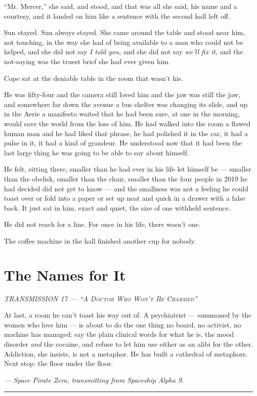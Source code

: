 \documentclass[11pt,openany]{book}
\newcommand{\transheader}{\normalfont\footnotesize\scshape\letterspace}
\newcommand{\letterspace}{}
\newenvironment{transmission}{%
  \par\vspace{0.3\baselineskip}\begin{center}\begin{minipage}{0.88\textwidth}%
  \itshape\small\setlength{\parindent}{0pt}\setstretch{1.06}}%
  {\end{minipage}\end{center}\vspace{0.4\baselineskip}%
  \noindent\hfil\rule{0.35\textwidth}{0.3pt}\hfil\par\vspace{1.0\baselineskip}}
\begin{document}
``Mr. Mercer,'' she said, and stood, and that was all she said, his name and a courtesy, and it landed on him like a sentence with the second half left off.

Sun stayed. Sun always stayed. She came around the table and stood near him, not touching, in the way she had of being available to a man who could not be helped, and she did not say \textit{I told you,} and she did not say \textit{we'll fix it,} and the not-saying was the truest brief she had ever given him.

Cope sat at the deniable table in the room that wasn't his.

He was fifty-four and the camera still loved him and the jaw was still the jaw, and somewhere far down the avenue a bus shelter was changing its slide, and up in the Aerie a manifesto waited that he had been sure, at one in the morning, would save the world from the loss of him. He had walked into the room a flawed human man and he had liked that phrase, he had polished it in the car, it had a pulse in it, it had a kind of grandeur. He understood now that it had been the last large thing he was going to be able to say about himself.

He felt, sitting there, smaller than he had ever in his life let himself be --- smaller than the obelisk, smaller than the chair, smaller than the four people in 2019 he had decided did not get to know --- and the smallness was not a feeling he could toast over or fold into a paper or set up neat and quick in a drawer with a false back. It just sat in him, exact and quiet, the size of one withheld sentence.

He did not reach for a line. For once in his life, there wasn't one.

The coffee machine in the hall finished another cup for nobody.

\clearpage
\chapter{The Names for It}

\begin{transmission}
{\transheader TRANSMISSION 17 --- ``A Doctor Who Won't Be Charmed''}\par\vspace{0.5em}
At last, a room he can't toast his way out of. A psychiatrist --- summoned by the women who love him --- is about to do the one thing no board, no activist, no machine has managed: say the plain clinical words for what he is, the mood disorder \textit{and} the cocaine, and refuse to let him use either as an alibi for the other. Addiction, she insists, is not a metaphor. He has built a cathedral of metaphors. Next stop: the floor under the floor.\par
\vspace{0.5em}\hfill\textit{--- Space Pirate Zero, transmitting from Spaceship Alpha 9.}\par
\end{transmission}
\end{document}
